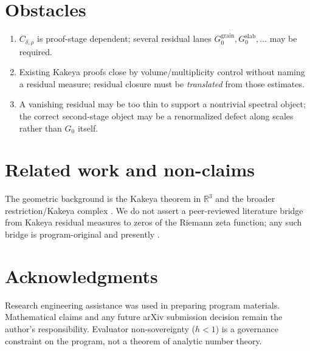 \documentclass[11pt]{amsart}
\theoremstyle{plain}
\theoremstyle{definition}
\newcommand{\Gzero}{G_0}
\newcommand{\Cdr}{C_{\delta,\rho}}
\begin{document}
\section{Obstacles}

\begin{enumerate}[leftmargin=*]
  \item $\Cdr$ is proof-stage dependent; several residual lanes
  $\Gzero^{\mathrm{grain}},\Gzero^{\mathrm{slab}},\ldots$ may be required.
  \item Existing Kakeya proofs close by volume/multiplicity control without
  naming a residual measure; residual closure must be \emph{translated} from
  those estimates.
  \item A vanishing residual may be too thin to support a nontrivial spectral
  object; the correct second-stage object may be a renormalized defect along
  scales rather than $\Gzero$ itself.
\end{enumerate}

\section{Related work and non-claims}

The geometric background is the Kakeya theorem in $\mathbb{R}^3$
\cite{WangZahl2025Kakeya,GuthWangZahl2026Streamlined} and the broader
restriction/Kakeya complex \cite{BennettCarberyTao2006,Guth2025LargeValues}.
We do not assert a peer-reviewed literature bridge from Kakeya residual
measures to zeros of the Riemann zeta function; any such bridge is
program-original and presently \PeAIceOpen.

\PeAIceOpenTargets

\section*{Acknowledgments}
Research engineering assistance was used in preparing program materials.
Mathematical claims and any future arXiv submission decision remain the
author's responsibility. Evaluator non-sovereignty ($h<1$) is a governance
constraint on the program, not a theorem of analytic number theory.



\end{document}
